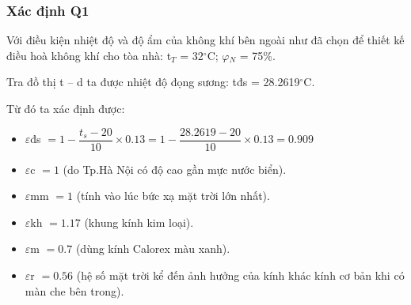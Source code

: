 \subsubsection{Xác định Q{\scriptsize 1}}
Với điều kiện nhiệt độ và độ ẩm của không khí bên ngoài như đã chọn để thiết kế điều hoà không khí cho tòa nhà: t$_{T}$ = 32$^{\circ}$C; {\large $\varphi$}$_{N}$ = 75\%.

Tra đồ thị t – d ta được nhiệt độ đọng sương: {\large t}{\scriptsize đs} = 28.2619$^{\circ}$C.

Từ đó ta xác định được:
\begin{itemize}
	\item {\Large $\varepsilon$}{\scriptsize đs} $= 1 -\dfrac{t_{s} - 20}{10}\times0.13 = 1 -\dfrac{28.2619 - 20}{10}\times0.13 = 0.909$
	
	\item {\Large $\varepsilon$}{\scriptsize c} $= 1$ (do Tp.Hà Nội có độ cao gần mực nước biển).
	
	\item {\Large $\varepsilon$}{\scriptsize mm} $= 1$ (tính vào lúc bức xạ mặt trời lớn nhất).
	
	\item {\Large $\varepsilon$}{\scriptsize kh} $= 1.17$ (khung kính kim loại).
	
	\item {\Large $\varepsilon$}{\scriptsize m} $= 0.7$ (dùng kính Calorex màu xanh).
	
	\item {\Large $\varepsilon$}{\scriptsize r} $= 0.56$ (hệ số mặt trời kể đến ảnh hưởng của kính khác kính cơ bản khi có màn che bên trong).
\end{itemize}

